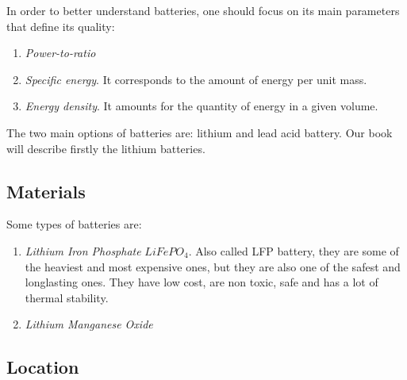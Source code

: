 In order to better understand batteries, one should focus on its main parameters that define its quality:



\begin{enumerate}
\item \textit{Power-to-ratio} %
\item \textit{Specific energy}. It corresponds to the amount of energy per unit mass.
\item \textit{Energy density}. It amounts for the quantity of energy in a given volume.
\end{enumerate}
The two main options of batteries are: lithium and lead acid battery. Our book will describe firstly the lithium batteries.

\subsection{Materials}

Some types of batteries are:

\begin{enumerate}
\item \textit{Lithium Iron Phosphate} $LiFePO_4$. Also called LFP battery, they are some of the heaviest and most expensive ones, but they are also one of the safest and longlasting ones. They have low cost, are non toxic, safe and has a lot of thermal stability. 
\item \textit{Lithium Manganese Oxide} %
\end{enumerate}


\subsection{Location}




